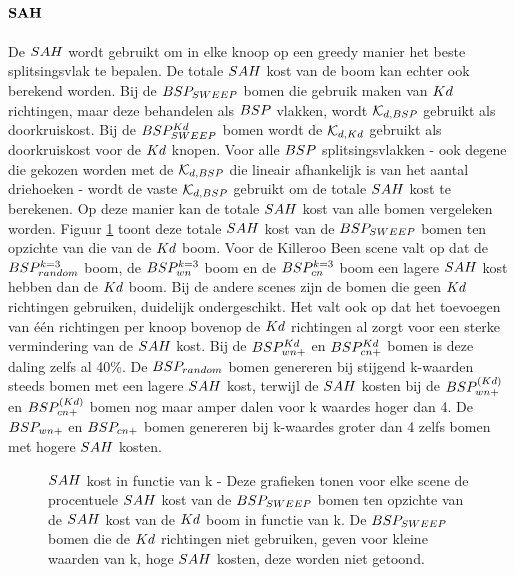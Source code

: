 \paragraph{$\mathbf{SAH}$}
De $\symSAH$ wordt gebruikt om in elke knoop op een greedy manier het beste splitsingsvlak te bepalen. De totale $\symSAH$ kost van de boom kan echter ook berekend worden. Bij de $BSP_{SWEEP}$ bomen die gebruik maken van $Kd$ richtingen, maar deze behandelen als $BSP$ vlakken, wordt $\mathcal{K}_{d,BSP}$ gebruikt als doorkruiskost. Bij de $BSP^{Kd}_{SWEEP}$ bomen wordt de $\mathcal{K}_{d,Kd}$ gebruikt als doorkruiskost voor de $Kd$ knopen. Voor alle $BSP$ splitsingsvlakken - ook degene die gekozen worden met de $\mathcal{K}_{d,BSP}$ die lineair afhankelijk is van het aantal driehoeken - wordt de vaste $\mathcal{K}_{d,BSP}$ gebruikt om de totale $\symSAH$ kost te berekenen.
Op deze manier kan de totale $\symSAH$ kost van alle bomen vergeleken worden.
Figuur \ref{fig:k-sah} toont deze totale $\symSAH$ kost van de $BSP_{SWEEP}$ bomen ten opzichte van die van de $Kd$ boom. 
Voor de Killeroo Been scene valt op dat de $BSP_{random}^{k=3}$ boom, de $BSP_{wn}^{k=3}$ boom en de $BSP_{cn}^{k=3}$ boom een lagere $\symSAH$ kost hebben dan de $Kd$ boom.
Bij de andere scenes zijn de bomen die geen $Kd$ richtingen gebruiken, duidelijk ondergeschikt.
Het valt ook op dat het toevoegen van één richtingen per knoop bovenop de $Kd$ richtingen al zorgt voor een sterke vermindering van de $\symSAH$ kost.
Bij de $BSP^{Kd}_{wn+}$ en $BSP^{Kd}_{cn+}$ bomen is deze daling zelfs al 40\%.
De $BSP_{random}$ bomen genereren bij stijgend k-waarden steeds bomen met een lagere $\symSAH$ kost, terwijl de $\symSAH$ kosten bij de $BSP^{(Kd)}_{wn+}$ en $BSP^{(Kd)}_{cn+}$ bomen nog maar amper dalen voor k waardes hoger dan 4. De $BSP_{wn+}$ en $BSP_{cn+}$ bomen genereren bij k-waardes groter dan 4 zelfs bomen met hogere $\symSAH$ kosten. 
\begin{figure}[h]
  \centering
  \begin{subfigure}[t]{.32\linewidth}
    \centering
{}
  \end{subfigure}
  \begin{subfigure}[t]{.32\linewidth}
    \centering
{}
\end{subfigure}
\begin{subfigure}[t]{.32\linewidth}
  \centering
{}
\end{subfigure}
\caption[$\symSAH$ kost in functie van k]{$\symSAH$ kost in functie van k - \small Deze grafieken tonen voor elke scene de procentuele $\symSAH$ kost van de $BSP_{SWEEP}$ bomen ten opzichte van de $\symSAH$ kost van de $Kd$ boom in functie van k. De $BSP_{SWEEP}$ bomen die de $Kd$ richtingen niet gebruiken, geven voor kleine waarden van k, hoge $\symSAH$ kosten, deze worden niet getoond.}
\label{fig:k-sah}
\end{figure}
